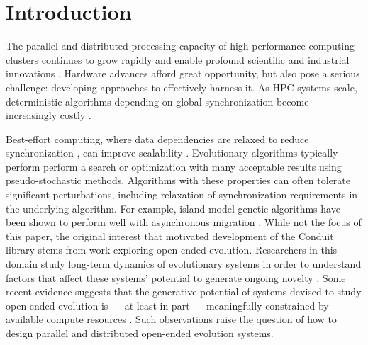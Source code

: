 \section{Introduction}

The parallel and distributed processing capacity of high-performance computing clusters continues to grow rapidly and enable profound scientific and industrial innovations \cite{gagliardi2019international}.
Hardware advances afford great opportunity, but also pose a serious challenge: developing approaches to effectively harness it.
As HPC systems scale, deterministic algorithms depending on global synchronization become increasingly costly \cite{gropp2013programming,dongarra2014applied}.

Best-effort computing, where data dependencies are relaxed to reduce synchronization \cite{chakradhar2010best}, can improve scalability \cite{meng2009best}.
Evolutionary algorithms typically perform perform a search or optimization with many acceptable results using pseudo-stochastic methods.
Algorithms with these properties can often tolerate significant perturbations, including relaxation of synchronization requirements in the underlying algorithm.
For example, island model genetic algorithms have been shown to perform well with asynchronous migration \cite{izzo2009parallel}.
While not the focus of this paper, the original interest that motivated development of the Conduit library stems from work exploring open-ended evolution.
Researchers in this domain study long-term dynamics of evolutionary systems in order to understand factors that affect these systems' potential to generate ongoing novelty \cite{taylor2016open}.
Some recent evidence suggests that the generative potential of systems devised to study open-ended evolution is --- at least in part --- meaningfully constrained by available compute resources \cite{channon2019maximum}.
Such observations raise the question of how to design parallel and distributed open-ended evolution systems.

